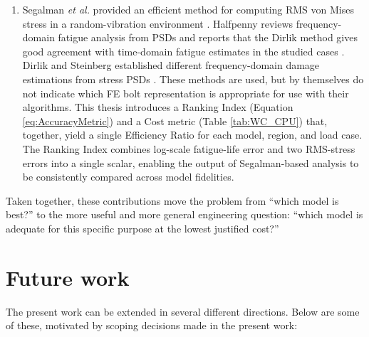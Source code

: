 \documentclass[a4paper,twoside]{bth}
\begin{document}
\begin{enumerate}
    \item Segalman \textit{et al.} provided an efficient method for computing \ac{RMS} von Mises stress in a random-vibration environment \cite{segalman_efficient_2000}. Halfpenny reviews frequency-domain fatigue analysis from PSDs and reports that the Dirlik method gives good agreement with time-domain fatigue estimates in the studied cases \cite{halfpenny_frequency_1999}. Dirlik and Steinberg established different frequency-domain damage estimations from stress PSDs \cite{dirlik_application_1985}. These methods are used, but by themselves do not indicate which \ac{FE} bolt representation is appropriate for use with their algorithms. This thesis introduces a Ranking Index (Equation \ref{eq:AccuracyMetric}) and a Cost metric (Table \ref{tab:WC_CPU}) that, together, yield a single Efficiency Ratio for each model, region, and load case. The Ranking Index combines log-scale fatigue-life error and two RMS-stress errors into a single scalar, enabling the output of Segalman-based analysis to be consistently compared across model fidelities.
\end{enumerate}

Taken together, these contributions move the problem from “which model is best?” to the more useful and more general engineering question: “which model is adequate for this specific purpose at the lowest justified cost?”
\newpage
\section{Future work}
The present work can be extended in several different directions. Below are some of these, motivated by scoping decisions made in the present work:
\end{document}
